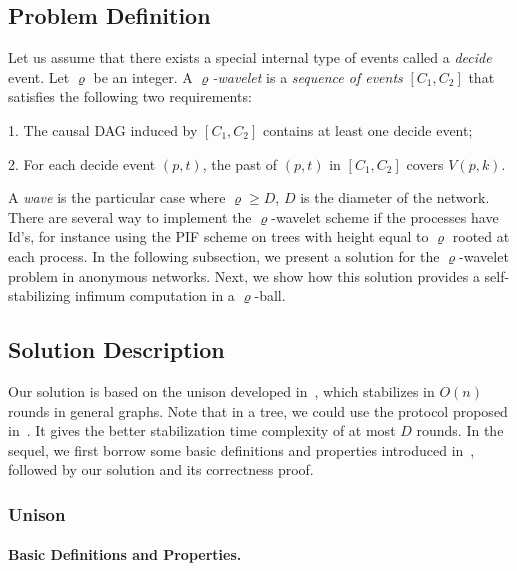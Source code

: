 \documentclass[11pt]{article}
\newcommand{\BEGLIST}{\begin{list}{}{\partopsep -2pt \parsep -2pt \listparindent 0pt}}\newcommand{\ENDLIST}{\end{list}}
\begin{document}
\subsection{Problem Definition}
Let us assume that there exists a special internal type of events called a \emph{decide} event. Let  $\varrho$ be an integer.
A \emph{$\varrho$-wavelet} is a \emph{sequence of events}  $\left[ C_{1},C_{2}\right]$
that satisfies the following two requirements:

\BEGLIST
\item [1.] The causal DAG induced by $\left[ C_{1},C_{2}\right] $ contains at least one decide event;

\item [2.] For each decide event $\left( p,t\right)$, the past of $\left( p,t\right) $ in 
$\left[ C_{1},C_{2}\right] $ covers $ V(p,k)$.
\ENDLIST


A \emph{wave} is the particular case where $\varrho \geq D$, $D$ is the diameter of the network.
There are several way to implement the $\varrho$-wavelet scheme if the processes have Id's, for instance using
the PIF scheme on trees with height equal to $\varrho$ rooted at each process.  In the following subsection,
we present a solution for the $\varrho$-wavelet problem in anonymous networks.  Next, we show how this solution 
provides a self-stabilizing infimum computation in a $\varrho$-ball.






\subsection{Solution Description}

Our solution is based on the unison developed in~\cite{BPV04b}, which  stabilizes in 
$O(n)$ rounds in general graphs. 
Note that in a tree, we could use the protocol proposed in~\cite{BPV06}.  It gives the better 
stabilization time complexity of at most $D$ rounds.
In the sequel, we first borrow some basic definitions and properties introduced in~\cite{BPV04b},
followed by our solution and its correctness proof. 

\subsubsection{Unison}
\label{sub:unison}



\paragraph{Basic Definitions and Properties.}
\end{document}
